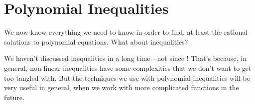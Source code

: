 \section{Polynomial Inequalities} 
We now know everything we need to know in order to find, at least the rational solutions to polynomial equations. What about inequalities?

We haven't discussed inequalities in a long time---not since ! That's because, in general, non-linear inequalities have some complexities that we don't want to get too tangled with. But the techniques we use with polynomial inequalities will be very useful in general, when we work with more complicated functions in the future.



 
 
 
 
 
